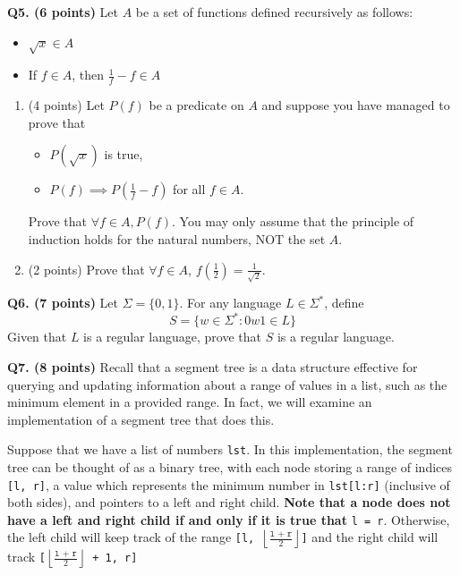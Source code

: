 \documentclass{article}
\begin{document}
    \pagebreak

    \noindent\textbf{Q5. (6 points)} Let \(A\) be a set of functions defined recursively as follows:
    \begin{itemize}
        \item \(\sqrt{x} \in A\) 
        \item If \(f \in A\), then \(\frac{1}{f} - f \in A\) 
    \end{itemize}
    
    \begin{enumerate}[label=\alph*)]
        \item (4 points) Let \(P(f)\) be a predicate on \(A\) and suppose you have managed to prove that
        \begin{itemize}
            \item \(P(\sqrt{x})\) is true,
            \item \(P(f) \implies P(\frac{1}{f} - f)\) for all \(f \in A\).
        \end{itemize}
        Prove that \(\forall f \in A, P(f)\). You may only assume that the principle of induction holds for the natural numbers, NOT the set \(A\).
        \vfill
        \item (2 points) Prove that \(\forall f \in A\), \(f \left( \frac{1}{2} \right) = \frac{1}{\sqrt{2}}\).
        \vfill
    \end{enumerate}

    \pagebreak

    \noindent\textbf{Q6. (7 points)} Let \(\Sigma = \{0, 1\}\). For any language \(L \in \Sigma ^*\), define
    \[
        S = \{w \in \Sigma ^* : 0w1 \in L\}
    \]
    Given that \(L\) is a regular language, prove that \(S\) is a regular language.

    \pagebreak

    \noindent\textbf{Q7. (8 points)} Recall that a segment tree is a data structure effective for querying and updating information about a range of values in a list, such as the minimum element in a provided range. In fact, we will examine an implementation of a segment tree that does this.

    \medskip

    Suppose that we have a list of numbers \texttt{lst}. In this implementation, the segment tree can be thought of as a binary tree, with each node storing a range of indices \texttt{[l, r]}, a value which represents the minimum number in \texttt{lst[l:r]} (inclusive of both sides), and pointers to a left and right child. \textbf{Note that a node does not have a left and right child if and only if it is true that} \texttt{l = r}. Otherwise, the left child will keep track of the range \texttt{[l, \(\left\lfloor \frac{\texttt{l + r}}{2} \right\rfloor\)]} and the right child will track \texttt{[\(\left\lfloor \frac{\texttt{l + r}}{2} \right\rfloor\) + 1, r]}
\end{document}
